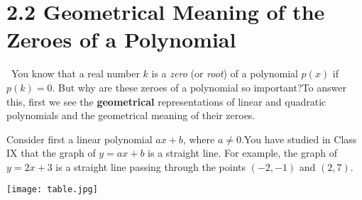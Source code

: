 \documentclass[12pt]{article}
\renewcommand{\headrulewidth}{0pt}
\begin{document}
\section*{2.2 Geometrical Meaning of the Zeroes of a Polynomial}
\vspace{-1em}
\ You know that a real number \( k \) is a \emph{zero} (or \emph{root}) of a polynomial \( p(x) \) if \( p(k) = 0 \).  But why are these zeroes of a polynomial so important?To answer this, first we see the \textbf {geometrical} representations of linear and quadratic polynomials and the geometrical meaning of their zeroes.


Consider first a linear polynomial \( ax + b \), where \( a \ne 0 \).You have studied in Class IX that the graph of \( y = ax + b \) is a straight line. For example, the graph of \( y = 2x + 3 \) is a straight line passing through the points \( (-2, -1) \) and \( (2, 7) \).

\pagestyle{fancy}
\fancyhf{}


\renewcommand{\headrulewidth}{1pt}
\renewcommand{\headrule}{\hbox to\headwidth{\color{myblue}\leaders\hrule height \headrulewidth\hfill}}

\fancyfoot[C]{}


\texttt{[image: table.jpg]}
\end{document}
